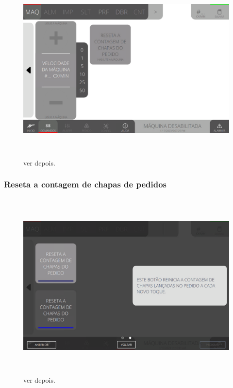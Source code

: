 \begin{figure}[h]
  \centering
  \includegraphics[width=576px,height=360px]{src/imagesFlexo/02-machine/e-Tela-Principal-2.png}
  \caption{ver depois.}
   \label{}
\end{figure}

\newpage
\thispagestyle{fancy}

\vspace*{\fill}

\subsubsection{\small{Reseta a contagem de chapas de pedidos}}

\begin{figure}[h]
  \centering
  \includegraphics[width=576px,height=360px]{src/imagesFlexo/02-machine/e-9.png}
  \caption{ver depois.}
   \label{}
\end{figure}

\vspace*{\fill}

